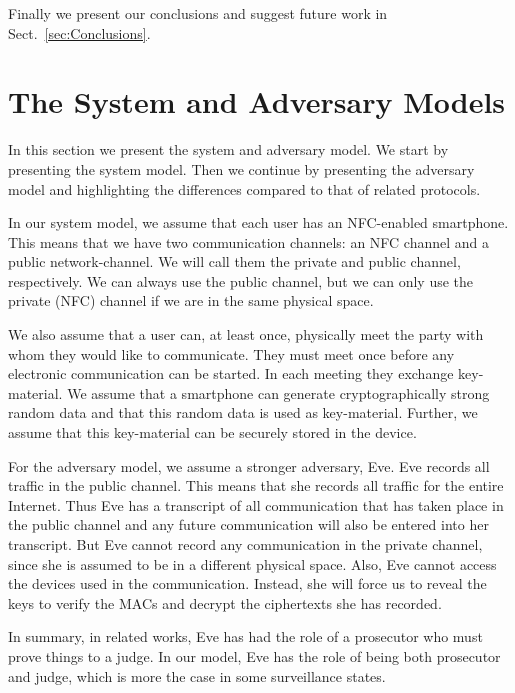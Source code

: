 Finally we present our conclusions and suggest future work in 
Sect.~\ref{sec:Conclusions}.


\section{The System and Adversary Models}
\label{sec:ModelsOverview}

In this section we present the system and adversary model.
We start by presenting the system model.
Then we continue by presenting the adversary model and highlighting the 
differences compared to that of related protocols.

In our system model, we assume that each user has an \ac{NFC}-enabled 
smartphone.
This means that we have two communication channels: an \ac{NFC} channel and 
a public network-channel.
We will call them the private and public channel, respectively.
We can always use the public channel, but we can only use the private 
(\ac{NFC}) channel if we are in the same physical space.

We also assume that a user can, at least once, physically meet the party with 
whom they would like to communicate.
They must meet once before any electronic communication can be started.
In each meeting they exchange key-material.
We assume that a smartphone can generate cryptographically strong random data 
and that this random data is used as key-material.
Further, we assume that this key-material can be securely stored in the device.

For the adversary model, we assume a stronger adversary, Eve.
Eve records all traffic in the public channel.
This means that she records all traffic for the entire Internet.
Thus Eve has a transcript of all communication that has taken place in the 
public channel and any future communication will also be entered into her 
transcript.
But Eve cannot record any communication in the private channel, since she is 
assumed to be in a different physical space.
Also, Eve cannot access the devices used in the communication.
Instead, she will force us to reveal the keys to verify the \acp{MAC} and 
decrypt the ciphertexts she has recorded.


In summary, in related works, Eve has had the role of a prosecutor who must 
prove things to a judge.
In our model, Eve has the role of being both prosecutor and judge, which is 
more the case in some surveillance states.

